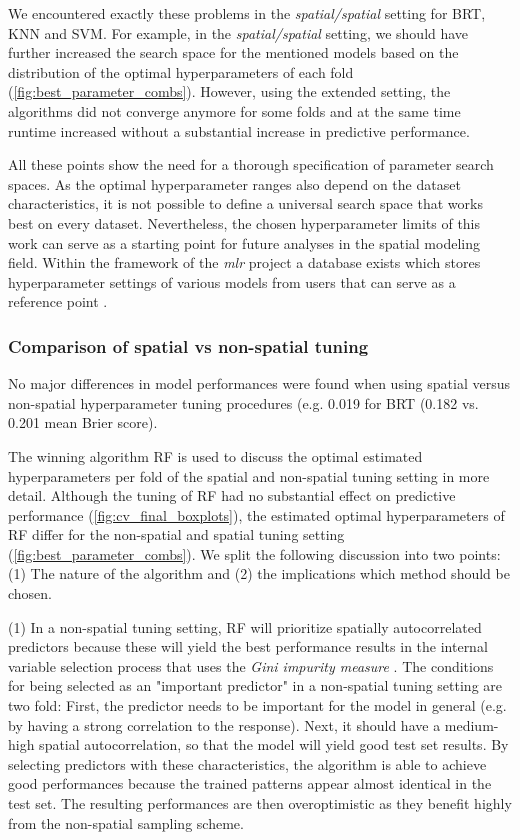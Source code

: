 \documentclass[review]{elsarticle}
\begin{document}
We encountered exactly these problems in the \emph{spatial/spatial} setting for BRT, KNN and SVM.
For example, in the \emph{spatial/spatial} setting, we should have further increased the search space for the mentioned models based on the distribution of the optimal hyperparameters of each fold (\autoref{fig:best_parameter_combs}).
However, using the extended setting, the algorithms did not converge anymore for some folds and at the same time runtime increased without a substantial increase in predictive performance.

All these points show the need for a thorough specification of parameter search spaces.
As the optimal hyperparameter ranges also depend on the dataset characteristics, it is not possible to define a universal search space that works best on every dataset.
Nevertheless, the chosen hyperparameter limits of this work can serve as a starting point for future analyses in the spatial modeling field.
Within the framework of the \textit{mlr} project a database exists which stores hyperparameter settings of various models from users that can serve as a reference point \citep{mlrhyperopt}.

\subsubsection{Comparison of spatial vs non-spatial tuning}
No major differences in model performances were found when using spatial versus non-spatial hyperparameter tuning procedures (e.g. 0.019 for \ac{BRT} (0.182 vs. 0.201 mean Brier score).

The winning algorithm RF is used to discuss the optimal estimated hyperparameters per fold of the spatial and non-spatial tuning setting in more detail.
Although the tuning of RF had no substantial effect on predictive performance (\autoref{fig:cv_final_boxplots}), the estimated optimal hyperparameters of RF differ for the non-spatial and spatial tuning setting (\autoref{fig:best_parameter_combs}).
We split the following discussion into two points: (1) The nature of the algorithm and (2) the implications which method should be chosen.

(1) In a non-spatial tuning setting, RF will prioritize spatially autocorrelated predictors because these will yield the best performance results in the internal variable selection process that uses the \textit{Gini impurity measure} \citep{Biau2016, Gordon1984}.
The conditions for being selected as an "important predictor" in a non-spatial tuning setting are two fold: First, the predictor needs to be important for the model in general (e.g. by having a strong correlation to the response).
Next, it should have a medium-high spatial autocorrelation, so that the model will yield good test set results. 
By selecting predictors with these characteristics, the algorithm is able to achieve good performances because the trained patterns appear almost identical in the test set.
The resulting performances are then overoptimistic as they benefit highly from the non-spatial sampling scheme.
\end{document}
